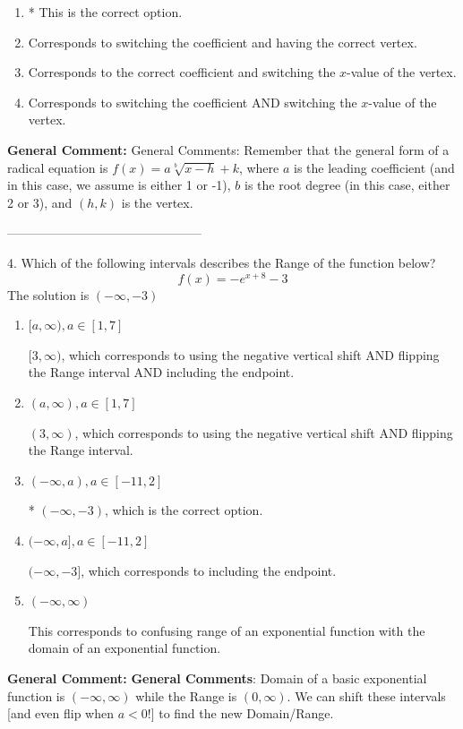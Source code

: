 \documentclass{extbook}[14pt]
\begin{document}
\begin{enumerate}[label=\Alph*.] 
\item * This is the correct option.  
\item Corresponds to switching the coefficient and having the correct vertex.  
\item Corresponds to the correct coefficient and switching the $x$-value of the vertex.  
\item Corresponds to switching the coefficient AND switching the $x$-value of the vertex.  
\end{enumerate} 
 
\textbf{General Comment:} General Comments: Remember that the general form of a radical equation is $ f(x) = a \sqrt[b]{x - h} + k $, where $a$ is the leading coefficient (and in this case, we assume is either 1 or -1), $b$ is the root degree (in this case, either 2 or 3), and $(h, k)$ is the vertex. 

-----------------------------------------------

4. Which of the following intervals describes the Range of the function below?
\[ f(x) = -e^{x+8}-3 \] 
The solution is $ (-\infty, -3) $ 

\begin{enumerate}[label=\Alph*.] 
\item $ [a, \infty), a \in [1, 7] $ 

 $[3, \infty)$, which corresponds to using the negative vertical shift AND flipping the Range interval AND including the endpoint. 
\item $ (a, \infty), a \in [1, 7] $ 

 $(3, \infty)$, which corresponds to using the negative vertical shift AND flipping the Range interval. 
\item $ (-\infty, a), a \in [-11, 2] $ 

 * $(-\infty, -3)$, which is the correct option. 
\item $ (-\infty, a], a \in [-11, 2] $ 

 $(-\infty, -3]$, which corresponds to including the endpoint. 
\item $ (-\infty, \infty) $ 

 This corresponds to confusing range of an exponential function with the domain of an exponential function. 
\end{enumerate} 
 
\textbf{General Comment:} \textbf{General Comments}: Domain of a basic exponential function is $(-\infty, \infty)$ while the Range is $(0, \infty)$. We can shift these intervals [and even flip when $a<0$!] to find the new Domain/Range. 
\end{document}
